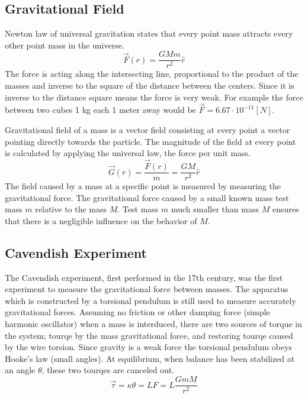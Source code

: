 \documentclass[\main/master.tex]{subfiles}
\begin{document}
\subsection{Gravitational Field}
Newton law of universal gravitation states that every point mass attracts every other point mass in the universe.
\begin{equation}
\overrightarrow{F}(r) = \frac{GMm}{r^2}\hat{r}    \label{eqn:gravitation_force}
\end{equation} 
The force is acting along the intersecting line, proportional to the product of the masses and inverse to the square of the distance between the centers. Since it is inverse to the distance square means the force is very weak. For example the force between two cubes 1 kg each 1 meter away would be $\overrightarrow{F} = 6.67\cdot10^{-11} [N]$.
\par
Gravitational field of a mass is a vector field consisting at every point a vector pointing directly towards the particle. The magnitude of the field at every point is calculated by applying the universal law, the force per unit mass. 
\begin{equation}
\overrightarrow{G}(r) = \frac{\overrightarrow{F}(r)}{m} = \frac{GM}{r^2}\hat{r}    \label{eqn:gravitation_field}
\end{equation}
The field caused by a mass at a specific point is measured by measuring the gravitational force. The gravitational force caused by a small known mass test mass $m$ relative to the mass $M$. Test mass $m$ much smaller than mass $M$ ensures that there is a negligible influence on the behavior of $M$.  



\subsection{Cavendish Experiment}
The Cavendish experiment, first performed in the 17th century, was the first experiment to measure the gravitational force between masses. The apparatus which is constructed by a torsional pendulum is still used to measure accurately gravitational forces. Assuming no friction or other damping force (simple harmonic oscillator) when a mass is interduced, there are two sources of torque in the system; tourqe by the mass gravitational force, and restoring tourqe caused by the wire torsion. Since gravity is a weak force the torsional pendulum obeys Hooke’s law (small angles). At equilibrium, when balance has been stabilized at an angle $\theta$, these two tourqes are canceled out.
\begin{equation}
\overrightarrow{\tau} = \kappa\theta = LF = L\frac{GmM}{r^2}    \label{eqn:gravitation_tourqe}
\end{equation}
\end{document}
